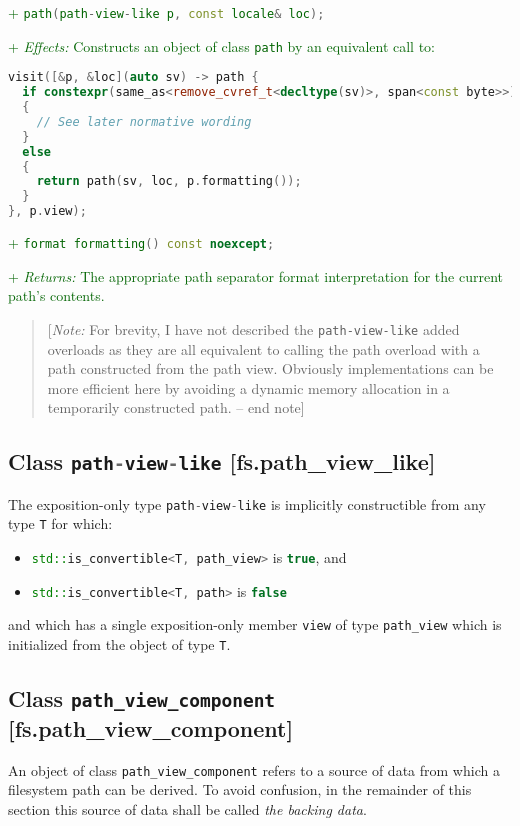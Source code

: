 \documentclass[11pt]{article}
\newcommand{\code}[2][cpp]{\lstinline[language=#1,basicstyle=\small\ttfamily]{#2}}
\newcommand{\desc}[1]{\textit{#1}}
\newcommand{\effects}{\desc{Effects: }}
\newcommand{\returns}{\desc{Returns: }}
\newcommand{\note}[1]{\begin{quote}[\textit{Note:} #1 -- end note]\end{quote}}
\newcommand{\tsreplace}[3]{\textcolor{red}{\sout{#1}}#2\textcolor{darkgreen}{#3}}
\begin{document}
\tsreplace{}{}{+ \code{path(path-view-like p, const locale& loc);}}

\tsreplace{}{}{+ \effects Constructs an object of class \code{path} by an equivalent call to:}
\begin{lstlisting}[language=cpp]
visit([&p, &loc](auto sv) -> path {
  if constexpr(same_as<remove_cvref_t<decltype(sv)>, span<const byte>>)
  {
    // See later normative wording
  }
  else
  {
    return path(sv, loc, p.formatting());
  }
}, p.view);
\end{lstlisting}

\tsreplace{}{}{+ \code{format formatting() const noexcept;}}

\tsreplace{}{}{+ \returns The appropriate path separator format interpretation for the current path's contents.}

\note{For brevity, I have not described the \code{path-view-like} added overloads as they are all equivalent to calling the path overload with a path constructed from the path view. Obviously implementations can be more efficient here by avoiding a dynamic memory allocation in a temporarily constructed path.}

\color{darkgreen}

\subsection*{Class \code{path-view-like} [fs.path\_view\_like]}

The exposition-only type \code{path-view-like} is implicitly constructible from any type \code{T} for which:

\begin{itemize}
\item \code{std::is_convertible<T, path_view>} is \code{true}, and
\item \code{std::is_convertible<T, path>} is \code{false}
\end{itemize}

and which has a single exposition-only member \code{view} of type \code{path_view} which is initialized from the object of type \code{T}.

\subsection*{Class \code{path_view_component} [fs.path\_view\_component]}

An object of class \code{path_view_component} refers to a source of data from which a filesystem path can be derived. To avoid confusion, in the remainder of this section this source of data shall be called \emph{the backing data}.
\end{document}
